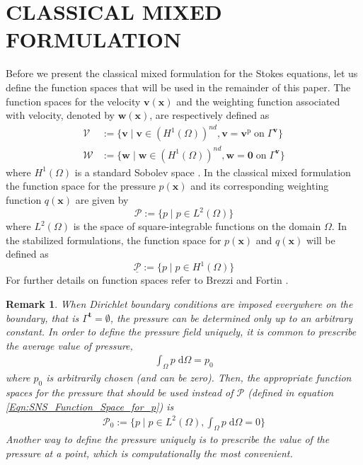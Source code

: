 \documentclass[11pt]{amsart}
\newtheorem{remark}[theorem]{Remark}
\begin{document}
   \section{CLASSICAL MIXED FORMULATION}
Before we present the classical mixed formulation for the Stokes equations, 
let us define the function spaces that will be used in the remainder of this paper. 
The function spaces for the velocity $\boldsymbol{v}(\boldsymbol{x})$ and the weighting 
function associated with velocity, denoted by $\boldsymbol{w}(\boldsymbol{x})$, are 
respectively defined as
\begin{align}
\label{Eqn:SNS_Function_Space_for_v}
  \mathcal{V} &:= \{\boldsymbol{v}  \; \big| \; \boldsymbol{v} \in (H^{1}(\Omega))^{nd},
  \boldsymbol{v} = \boldsymbol{v}^{\mathrm{p}} \; \mathrm{on} \; \Gamma^{\boldsymbol{v}} \} \\
\label{Eqn:SNS_Function_Space_for_w}
  \mathcal{W} &:= \{\boldsymbol{w}  \; \big| \; \boldsymbol{w} \in (H^{1}(\Omega))^{nd},
  \boldsymbol{w} = \boldsymbol{0} \; \mathrm{on} \; \Gamma^{\boldsymbol{v}} \}
\end{align}
where $H^1(\Omega)$ is a standard Sobolev space \cite{Brezzi}. In the classical mixed 
formulation the function space for the pressure $p(\boldsymbol{x})$ and its corresponding 
weighting function $q(\boldsymbol{x})$ are given by 
\begin{equation}
  \label{Eqn:SNS_Function_Space_for_p}
  \mathcal{P} := \{p \; \big| \; p \in L^{2}(\Omega) \}
\end{equation}
where $L^2(\Omega)$ is the space of square-integrable functions on the domain $\Omega$. In the stabilized formulations, the function space for $p(\boldsymbol{x})$ and $q(\boldsymbol{x})$ will be defined as
 \begin{equation}
  \label{Eqn:SNS_HVM_Function_Space_for_p}
  \underline{\mathcal{P}} := \{p \; \big| \; p \in H^{1}(\Omega) \}
\end{equation}
For further details on function spaces refer to Brezzi and Fortin \cite{Brezzi}. 
\begin{remark}
  When Dirichlet boundary conditions are imposed everywhere on the boundary, 
  that is $\Gamma^{\boldsymbol{t}} = \emptyset$, the pressure 
  can be determined only up to an arbitrary constant. In order to define the 
  pressure field uniquely, it is common to prescribe the average value of pressure,
  \begin{align}
    \int_{\Omega} p \; \mathrm{d} \Omega = p_0 
  \end{align}
  where $p_0$ is arbitrarily chosen (and can be zero).  Then, the appropriate function spaces for the pressure that should be used instead of 
  $\mathcal{P}$ (defined in equation \eqref{Eqn:SNS_Function_Space_for_p}) is 
  \begin{align}
    \mathcal{P}_0 := \{p \; \big| \; p \in L^{2}(\Omega), \int_{\Omega} p \; \mathrm{d} \Omega  = 0\}
  \end{align}
  Another way to define the pressure uniquely is to prescribe the value of the 
  pressure at a point, which is computationally the most convenient. 
\end{remark}
\end{document}
